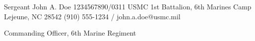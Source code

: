 \setFrom
    {Sergeant John A. Doe 1234567890/0311 USMC}  %
    {1st Battalion, 6th Marines}                  %
    {Camp Lejeune, NC 28542}                      %
    {(910) 555-1234 / john.a.doe@usmc.mil}        %


%
%
%
%

\setTo
    {Commanding Officer, 6th Marine Regiment}   %
    {}                                           %
    {}                                           %
    {}                                           %


%
%
%
%



%
%
%
%

